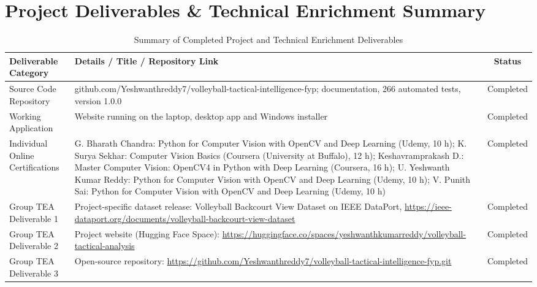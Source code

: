 \documentclass[11pt, a4paper]{article}
\begin{document}
\section{Project Deliverables \& Technical Enrichment Summary}
\begin{table}[H]
    \centering
    \footnotesize
    \renewcommand{\arraystretch}{1.2}
    \begin{tabular}{|p{4.2cm}|p{8.6cm}|c|}
        \hline
        \textbf{Deliverable Category} & \textbf{Details / Title / Repository Link} & \textbf{Status} \\
        \hline
        Source Code Repository & github.com/Yeshwanthreddy7/volleyball-tactical-intelligence-fyp; documentation, 266 automated tests, version 1.0.0 & Completed \\
        \hline
        Working Application & Website running on the laptop, desktop app and Windows installer & Completed \\
        \hline
        Individual Online Certifications & G. Bharath Chandra: Python for Computer Vision with OpenCV and Deep Learning (Udemy, 10 h); K. Surya Sekhar: Computer Vision Basics (Coursera (University at Buffalo), 12 h); Keshavramprakash D.: Master Computer Vision: OpenCV4 in Python with Deep Learning (Coursera, 16 h); U. Yeshwanth Kumar Reddy: Python for Computer Vision with OpenCV and Deep Learning (Udemy, 10 h); V. Punith Sai: Python for Computer Vision with OpenCV and Deep Learning (Udemy, 10 h) & Completed \\
        \hline
        Group TEA Deliverable 1 & Project-specific dataset release: Volleyball Backcourt View Dataset on IEEE DataPort, \url{https://ieee-dataport.org/documents/volleyball-backcourt-view-dataset} & Completed \\
        \hline
        Group TEA Deliverable 2 & Project website (Hugging Face Space): \url{https://huggingface.co/spaces/yeshwanthkumarreddy/volleyball-tactical-analysis} & Completed \\
        \hline
        Group TEA Deliverable 3 & Open-source repository: \url{https://github.com/Yeshwanthreddy7/volleyball-tactical-intelligence-fyp.git} & Completed \\
        \hline
    \end{tabular}
    \caption{Summary of Completed Project and Technical Enrichment Deliverables}
\end{table}

\vspace{0.2cm}
\nocite{*}
\renewcommand{\refname}{\large\bfseries\color{amritaMaroon}References}


\end{document}

